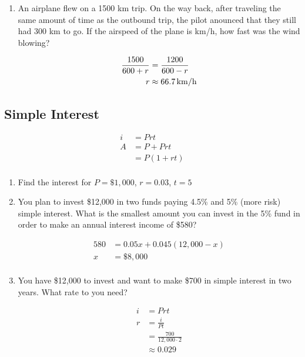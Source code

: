 \documentclass[letterpaper, landscape]{exam}
\begin{document}
\begin{enumerate}
    \item An airplane flew on a 1500 km trip. On the way back, after traveling the same amount of
      time as the outbound trip, the pilot anounced that they still had 300 km to go. If the
      airspeed of the plane is \unit[600]{km/h}, how fast was the wind blowing?

      \begin{align*}
        \frac{1500}{600 + r} & = \frac{1200}{600 - r} \\
        r                    & \approx \unit[66.7]{km/h} \\
      \end{align*}

  \end{enumerate}
  
  \subsection{Simple Interest} %

  \begin{align*}
    i & = Prt \\
    A & = P + Prt \\
      & = P(1 + rt) \\
  \end{align*}

  \begin{enumerate}
    \item Find the interest for $P = \$1,000$, $r = 0.03$, $t = 5$

    \item You plan to invest \$12,000 in two funds paying 4.5\% and 5\% (more risk) simple interest.
      What is the smallest amount you can invest in the 5\% fund in order to make an annual interest
      income of \$580?

      \begin{align*}
        580 & = 0.05 x + 0.045 (12,000 - x) \\
        x   & = \$8,000 \\
      \end{align*}

    \item You have \$12,000 to invest and want to make \$700 in simple interest in two years. What
      rate to you need?

      \begin{align*}
        i & = Prt \\
        r & = \frac{i}{Pt} \\
          & = \frac{700}{12,000 \cdot 2} \\
          & \approx \boxed{ 0.029 } \\
      \end{align*}


  \end{enumerate}
  
\end{document}
